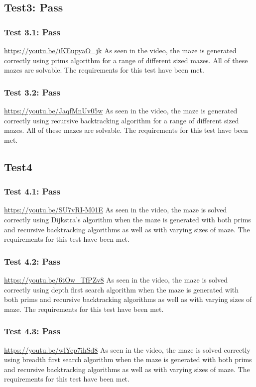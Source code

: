 \documentclass[titlepage]{article}
\begin{document}
\subsection*{Test3: Pass}
\subsubsection*{Test 3.1: Pass}
\url{https://youtu.be/iKEupyaO_jk}
As seen in the video, the maze is generated correctly using prims algorithm for a range of different sized mazes. All of these mazes are solvable. The requirements for this test have been met.

\subsubsection*{Test 3.2: Pass}
\url{https://youtu.be/JaqfMnUv05w}
As seen in the video, the maze is generated correctly using recursive backtracking algorithm for a range of different sized mazes. All of these mazes are solvable. The requirements for this test have been met.

\subsection*{Test4}
\subsubsection*{Test 4.1: Pass}
\url{https://youtu.be/SU7yRI-M01E}
As seen in the video, the maze is solved correctly using Dijkstra's algorithm when the maze is generated with both prims and recursive backtracking algorithms as well as with varying sizes of maze. The requirements for this test have been met.
\subsubsection*{Test 4.2: Pass}
\url{https://youtu.be/6tOw_TfPZv8}
As seen in the video, the maze is solved correctly using depth first search algorithm when the maze is generated with both prims and recursive backtracking algorithms as well as with varying sizes of maze. The requirements for this test have been met.
\subsubsection*{Test 4.3: Pass}
\url{https://youtu.be/wlYep7ihSd8}
As seen in the video, the maze is solved correctly using breadth first search algorithm when the maze is generated with both prims and recursive backtracking algorithms as well as with varying sizes of maze. The requirements for this test have been met.
\end{document}
